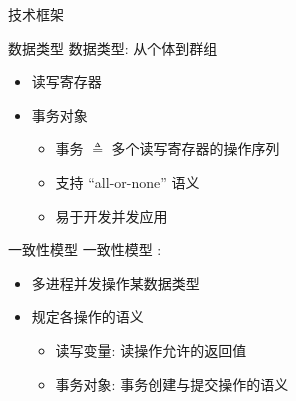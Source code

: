 \begin{frame}{技术框架}
\end{frame}
\begin{frame}{数据类型}
	数据类型: 从个体到群组
	\pause
	\vspace{0.20cm}
	\begin{itemize}
	  \setlength{\itemsep}{8pt}
	  \item<2-> 读写寄存器
	  \item<3-> 事务对象
		\begin{itemize}
		  \setlength{\itemsep}{4pt}
		  \item 事务 $\triangleq$ 多个读写寄存器的操作序列
		  \item 支持 ``all-or-none'' 语义
		  \item 易于开发并发应用
		\end{itemize}
	\end{itemize}
\end{frame}
\begin{frame}{一致性模型}
  一致性模型  :
  \begin{itemize}
    \item 多进程并发操作某数据类型
	\item 规定各操作的语义
	  \begin{itemize}
		\setlength{\itemsep}{2pt}
		\item 读写变量: 读操作允许的返回值 
		\item 事务对象: 事务创建与提交操作的语义
	  \end{itemize}
  \end{itemize}

  \vspace{0.20cm}
\end{frame}
